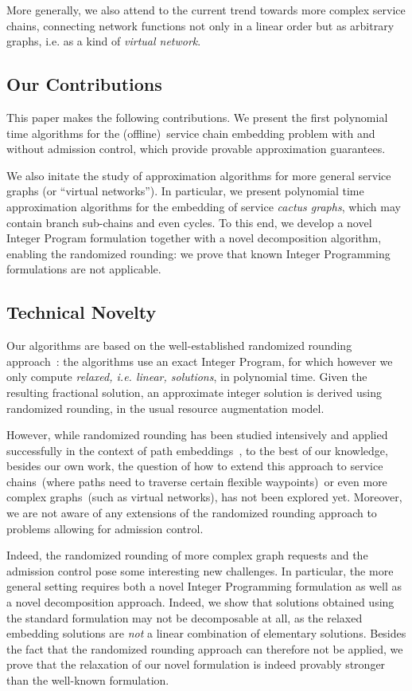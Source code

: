 \documentclass[10pt, conference, letterpaper]{IEEEtran}
\begin{document}
More generally, we also attend to the current trend towards more complex service chains, 
connecting network functions not only in a linear order 
but as arbitrary graphs, i.e. as a kind of \emph{virtual network}. 

\subsection{Our Contributions}
 
This paper makes the following contributions.
We present the first polynomial time algorithms for the (offline)~service chain
embedding problem with and without admission control, which provide provable approximation guarantees.

We also initate the study of approximation algorithms 
for more general service graphs (or ``virtual networks''). In particular, 
we present polynomial time
approximation algorithms for the embedding of service 
\emph{cactus graphs}, which may contain branch sub-chains and even cycles. To this end, we develop a novel Integer Program formulation together with a novel decomposition algorithm, 
enabling the randomized rounding: we prove that known Integer Programming formulations are not applicable. 

\subsection{Technical Novelty}

Our algorithms are based on the well-established  
randomized rounding approach~\cite{Raghavan-Thompson}:
the algorithms use an exact Integer Program, 
for which however we only compute \emph{relaxed, i.e. linear, solutions}, 
in polynomial time.
Given the resulting fractional solution, an approximate
integer solution is derived using randomized rounding, 
in the usual resource augmentation model.

However, while randomized rounding has been studied
intensively and applied successfully in the context of path embeddings~\cite{Raghavan-Thompson},
to the best of our knowledge, besides our own work,
the question of how to extend this approach to service chains~(where
paths need to traverse certain flexible waypoints)~or even more
complex graphs~(such as virtual networks),  has not been explored
yet. 
Moreover, we are not aware of any extensions of the randomized rounding
approach to problems allowing for admission control. 

Indeed, the randomized rounding of more complex graph requests
and the admission control pose some interesting new challenges. 
In particular, the more general setting requires both a novel Integer Programming formulation as well as a novel decomposition approach. 
Indeed, we show that solutions obtained using the standard formulation \cite{vnep,rostSchmidFeldmann2014} may not be decomposable at all,
as the relaxed embedding solutions are \emph{not} 
a linear combination of elementary solutions. Besides the fact that the randomized rounding approach can therefore not be applied, we prove that the relaxation of our novel formulation is indeed provably stronger than the well-known formulation.
\end{document}
